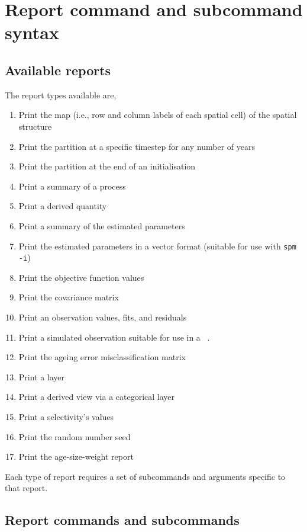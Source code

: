 \section{Report command and subcommand syntax\label{sec:report-syntax}}

\subsection{Available reports}

The report types available are,

\begin{enumerate}
  \item Print the map (i.e., row and column labels of each spatial cell) of the spatial structure
  \item Print the partition at a specific timestep for any number of years
  \item Print the partition at the end of an initialisation
  \item Print a summary of a process
  \item Print a derived quantity
  \item Print a summary of the estimated parameters
  \item Print the estimated parameters in a vector format (suitable for use with \texttt{spm -i})
  \item Print the objective function values
  \item Print the covariance matrix
  \item Print an observation values, fits, and residuals
  \item Print a simulated observation suitable for use in a \SPM\ \config.
  \item Print the ageing error misclassification matrix
  \item Print a layer
  \item Print a derived view via a categorical layer
  \item Print a selectivity's values
  \item Print the random number seed
  \item Print the age-size-weight report
\end{enumerate}

Each type of report requires a set of subcommands and arguments specific to that report.

\subsection{Report commands and subcommands}

